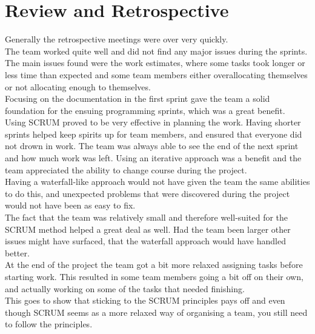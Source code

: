 \section{Review and Retrospective}

Generally the retrospective meetings were over very quickly.\\
The team worked quite well and did not find any major issues during the sprints.\\ 
The main issues found were the work estimates, where some tasks took longer or less time than expected and some team members either overallocating themselves or not allocating enough to themselves.\\
Focusing on the documentation in the first sprint gave the team a solid foundation for the ensuing programming sprints, which was a great benefit.\\
Using SCRUM proved to be very effective in planning the work. Having shorter sprints helped keep spirits up for team members, and ensured that everyone did not drown in work. The team was always able to see the end of the next sprint and how much work was left.
Using an iterative approach was a benefit and the team appreciated the ability to change course during the project. \\
Having a waterfall-like approach would not have given the team the same abilities to do this, and unexpected problems that were discovered during the project would not have been as easy to fix. \\
The fact that the team was relatively small and therefore well-suited for the SCRUM method helped a great deal as well. Had the team been larger other issues might have surfaced, that the waterfall approach would have handled better.
\\At the end of the project the team got a bit more relaxed assigning tasks before starting work. This resulted in some team members going a bit off on their own, and actually working on some of the tasks that needed finishing.\\
This goes to show that sticking to the SCRUM principles pays off and even though SCRUM seems as a more relaxed way of organising a team, you still need to follow the principles.